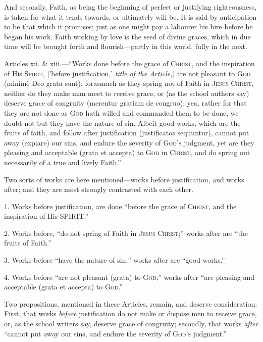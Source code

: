 And secondly, Faith, as being the beginning of perfect or
justifying righteousness, is taken for what it tends towards, or
ultimately will be. It is said by anticipation to be that which it
promises; just as one might pay a labourer his hire before he began
his work. Faith working by love is the seed of divine graces, which in
due time will be brought forth and flourish—partly in this world,
fully in the next.


Articles xii. \& xiii.—``Works done before the grace of C\textsc{hrist},
and the inspiration of His S\textsc{pirit}, ['before
justification,' \emph{title of the Article},] are not pleasant to G\textsc{od}
(minimè Deo grata sunt); forasmuch as they spring not of Faith in J\textsc{esus}
C\textsc{hrist}, neither do they make man meet to receive
grace, or (as the school authors say) deserve grace of congruity (merentur
gratiam de congruo); yea, rather for that they are not done as G\textsc{od}
hath willed and commanded them to be done, we doubt not but they have
the nature of sin. Albeit good works, which are the fruits of faith,
and follow after justification (justificatos sequuntur), cannot put
away (expiare) our sins, and endure the severity of G\textsc{od's}
judgment, yet are they pleasing and acceptable (grata et accepta) to G\textsc{od}
in C\textsc{hrist}, and do spring out necessarily of a
true and lively Faith.''

Two sorts of works are here mentioned—works before justification,
and works after; and they are most strongly contrasted with each
other.

1. Works before justification, are done ``before the grace of C\textsc{hrist},
and the inspiration of His SPIRIT.''

2. Works before, ``do not spring of Faith in J\textsc{esus}
C\textsc{hrist};'' works after are ``the fruits
of Faith.''

3. Works before ``have the nature of sin;'' works after are
``good works.''

4. Works before ``are not pleasant (grata) to G\textsc{od};''
works after ``are pleasing and acceptable (grata et accepta) to G\textsc{od}.''

Two propositions, mentioned in these Articles, remain, and deserve
consideration: First, that works \emph{before} justification do not
make or dispose men to receive grace, or, as the school writers say,
deserve grace of congruity; secondly, that works \emph{after}
``cannot put away our sins, and endure the severity of G\textsc{od's}
judgment.''

